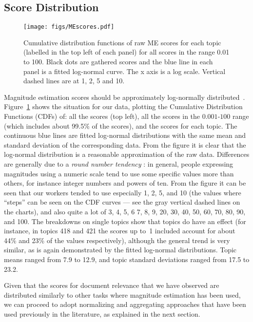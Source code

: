 \subsection{Score Distribution}
\label{sec:score-distribution}

\begin{figure}[t]
  \centering
  \texttt{[image: figs/MEscores.pdf]}
  \caption{Cumulative distribution functions of raw ME scores for each topic 
(labelled in the top left of each panel) for all scores in the range
0.01 to 100. Black dots are gathered scores and the blue line in each panel is a 
fitted log-normal curve. The x axis is a log scale. 
Vertical dashed lines are at 1, 2, 5 and 10.}
  \label{fig:ME-raw-scores}
\end{figure}

Magnitude estimation scores should be approximately
log-normally distributed~\citep{Mar74,moskowitz:1977}. 
Figure~\ref{fig:ME-raw-scores} shows the situation for our data, 
plotting the Cumulative Distribution Functions (CDFs) of:
all the scores (top left), all the scores in the $0.001$-$100$ range
(which includes about 99.5\% of the scores), and the scores for each
topic. 
The continuous blue lines are fitted log-normal distributions with the
same mean and standard deviation of the corresponding data.  
From the figure it is clear that the log-normal distribution is a
reasonable approximation of the raw data. 
Differences are generally due to a \emph{round number tendency}
\cite{moskowitz:1977}: in general, people expressing magnitudes using
a numeric scale tend to use some specific values more than others, for
instance integer numbers and powers of ten. 
From the figure it can be seen that our workers tended to use
especially 1, 2, 5, and 10 (the values where ``steps'' can be seen on
the CDF curves --- see the gray vertical dashed lines on the charts),
and also quite a lot of 3, 4, 5, 6 7, 8, 9, 20, 30, 40, 50, 60, 70,
80, 90, and 100. 
The breakdowns on single topics show that topics do have an effect
(for instance, in topics 418 and 421 the scores up to~1 included
account for about 44\% and 23\% of the values respectively), although
the general trend is very similar, as is again demonstrated by the
fitted log-normal distributions.
Topic means ranged from 7.9 to 12.9, and topic standard deviations ranged
from 17.5 to 23.2.

Given that the scores for document relevance that we
have observed are distributed similarly to other tasks where magnitude
estimation has been used, we can proceed to adopt normalizing and
aggregating approaches that have been used previously in the literature, as
explained in the next section.

